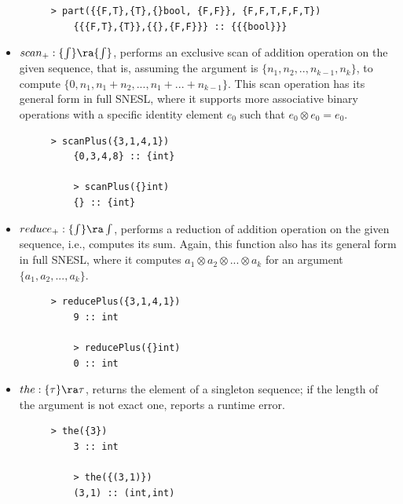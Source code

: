 \begin{itemize}
\begin{figure}[H]
\begin{lstlisting}[style = nesl-style]
	> part({{F,T},{T},{}bool, {F,F}}, {F,F,T,F,F,T})
	{{{F,T},{T}},{{},{F,F}}} :: {{{bool}}}
	\end{lstlisting}
	\end{figure}
	
	\item $\*{scan_+}: \{\int\} \ra \{\int\}$, performs an exclusive scan of addition operation on the given sequence, that is, assuming the argument is $\{n_1,n_2,..,n_{k-1},n_k\}$, to compute $\{0, n_1,n_1+n_2,...,n_1+...+n_{k-1}\}$. This scan operation has its general form in full SNESL, where it supports more associative binary operations with a specific identity element $e_0$  such that $e_0 \otimes e_0 = e_0$.
	\begin{figure}[H]
	\begin{example}
	\end{example}
	\begin{lstlisting}[style = nesl-style]
	> scanPlus({3,1,4,1})
	{0,3,4,8} :: {int}
	
	> scanPlus({}int)
	{} :: {int}
	\end{lstlisting}
	\end{figure}
	
	\item $\*{reduce_+: \{\int\} \ra \int }$, performs a reduction of addition operation on the given sequence, i.e., computes its sum. 
	Again, this function also has its general form in full SNESL, where it computes $a_1 \otimes a_2 \otimes... \otimes a_k $ for an argument $\{a_1,a_2,...,a_k\}$.
	\begin{figure}[H]
	\begin{example}
	\end{example}
	\begin{lstlisting}[style = nesl-style]
	> reducePlus({3,1,4,1})
	9 :: int
	
	> reducePlus({}int)
	0 :: int
	\end{lstlisting}
	\end{figure}


	\item $\*{the:  \{\tau\} \ra \tau}$, returns the element of a singleton sequence; if the length of the argument is not exact one, reports a runtime error. 
	\begin{figure}[H]
	\begin{example}
	\end{example}
	\begin{lstlisting}[style = nesl-style]
	> the({3})
	3 :: int
	
	> the({(3,1)})
	(3,1) :: (int,int)
	\end{lstlisting}
	\end{figure}
	

\end{itemize}
